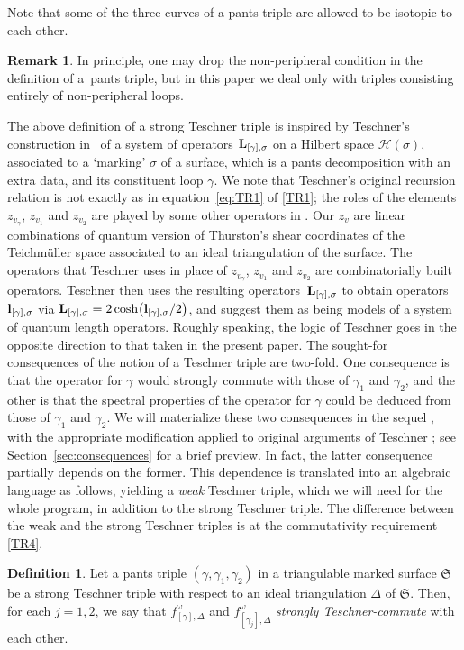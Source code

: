 \documentclass[10pt,a4paper]{amsart}
\numberwithin{equation}{section}
\theoremstyle{definition}
\newtheorem{Definition}[Theorem]{Definition}
\newtheorem{Remark}[Theorem]{Remark}
\begin{document}
Note that some of the three curves of a pants triple are allowed to be isotopic to each other.
\begin{Remark}
In principle, one may drop the non-peripheral condition in the definition of a~pants triple, but in this paper we deal only with triples consisting entirely of non-peripheral loops.
\end{Remark}
The above definition of a strong Teschner triple is inspired by Teschner's construction in~\cite{T} of a system of operators ${\bf L}_{[\gamma], \sigma}$ on a Hilbert space $\mathcal{H}(\sigma)$, associated to a `marking' $\sigma$ of a surface, which is a pants decomposition with an extra data, and its constituent loop $\gamma$. We note that Teschner's original recursion relation is not exactly as in equation~\eqref{eq:TR1} of \ref{TR1}; the roles of the elements $z_{v_\gamma}$, $z_{v_1}$ and $z_{v_2}$ are played by some other operators in \cite{T}. Our $z_v$ are linear combinations of quantum version of Thurston's shear coordinates of the Teichm\"uller space associated to an ideal triangulation of the surface. The operators that Teschner uses in place of $z_{v_\gamma}$, $z_{v_1}$ and $z_{v_2}$ are combinatorially built operators. Teschner then uses the resulting operators~${\bf L}_{[\gamma],\sigma}$ to obtain operators~${\bf l}_{[\gamma],\sigma}$ via ${\bf L}_{[\gamma],\sigma} = 2\cosh\bigl({\bf l}_{[\gamma],\sigma}/2\bigr)$, and suggest them as being models of a system of quantum length operators. Roughly speaking, the logic of Teschner goes in the opposite direction to that taken in the present paper.
The sought-for consequences of the notion of a Teschner triple are two-fold. One consequence is that the operator for $\gamma$ would strongly commute with those of $\gamma_1$ and $\gamma_2$, and the other is that the spectral properties of the operator for $\gamma$ could be deduced from those of $\gamma_1$ and $\gamma_2$. We will materialize these two consequences in the sequel \cite{sequel}, with the appropriate modification applied to original arguments of Teschner \cite{T}; see Section~\ref{sec:consequences} for a brief preview. In fact, the latter consequence partially depends on the former. This dependence is translated into an algebraic language as follows, yielding a {\it weak} Teschner triple, which we will need for the whole program, in addition to the strong Teschner triple. The difference between the weak and the strong Teschner triples is at the commutativity requirement \ref{TR4}.
\begin{Definition}
\label{def:Teschner-commute}
Let a pants triple $(\gamma,\gamma_1,\gamma_2)$ in a triangulable marked surface $\mathfrak{S}$ be a strong Teschner triple with respect to an ideal triangulation $\Delta$ of $\mathfrak{S}$. Then, for each $j=1,2$, we say that $f^\omega_{[\gamma],\Delta}$ and $f^\omega_{[\gamma_j],\Delta}$ {\em strongly Teschner-commute} with each other.
\end{Definition}
\end{document}
